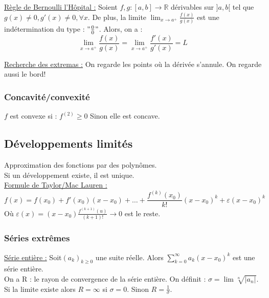 \documentclass[../main.tex]{subfiles}
\begin{document}
\quad \underline{Règle de Bernoulli l'Hôpital :} Soient $f,g:[a,b] \rightarrow \mathbb{R}$ dérivables sur $]a,b[$ tel que $g(x) \neq 0, g'(x) \neq 0, \forall x$. De plus, la limite $\lim_{x\rightarrow a^+} \frac{f(x)}{g(x)}$ est une indétermination du type : $"\frac{0}{0}"$. Alors, on a :\\
\begin{equation}
    \lim_{x\rightarrow a^+} \frac{f(x)}{g(x)} = \lim_{x\rightarrow a^+} \frac{f'(x)}{g'(x)} = L
\end{equation}

\quad \underline{Recherche des extremas :} On regarde les points où la dérivée s'annule. On regarde aussi le bord!\\

\subsubsection{Concavité/convexité}
$f$ est convexe si : $f^{(2)} \geq 0$ Sinon elle est concave. \\

\subsection{Développements limités}
Approximation des fonctions par des polynômes.\\
Si un développement existe, il est unique.\\

\quad  \underline{Formule de Taylor/Mac Lauren :}\\
\begin{equation}
    f(x) = f(x_0) + f'(x_0) (x-x_0) + \dots + \frac{f^{(k)}(x_0)}{k!}(x-x_0)^k + \varepsilon(x-x_0)^k
\end{equation}
Où $\varepsilon(x) = (x-x_0) \frac{f^{(k+1)}(u)}{(k+1)!} \rightarrow 0$ est le reste.\\

\subsubsection{Séries extrêmes}
\quad \underline{Série entière :}
Soit$(a_k)_{k\geq 0}$ une suite réelle. Alors $\sum_{k=0}^{\infty} a_k (x-x_0)^k$ est une série entière.\\

On a R : le rayon de convergence de la série entière. On définit : $\sigma = \lim \sqrt[n]{|a_n|}$. Si la limite existe alors $R= \infty$ si $\sigma = 0$. Sinon $R = \frac{1}{\sigma}$.\\
\end{document}
